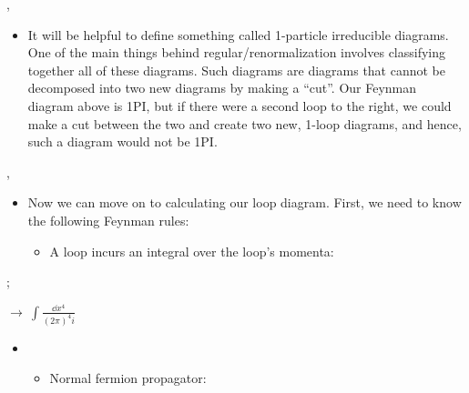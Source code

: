\sep

\begin{itemize}
    \item It will be helpful to define something called 1-particle irreducible diagrams. One of the main things behind regular/renormalization involves classifying together all of these diagrams. Such diagrams are diagrams that cannot be decomposed into two new diagrams by making a ``cut''. Our Feynman diagram above is 1PI, but if there were a second loop to the right, we could make a cut between the two and create two new, 1-loop diagrams, and hence, such a diagram would not be 1PI.
\end{itemize}


\sep


\begin{itemize}
    \item Now we can move on to calculating our loop diagram. First, we need to know the following Feynman rules:
    \begin{itemize}
        \item A loop incurs an integral over the loop's momenta:
    \end{itemize}
\end{itemize}

\begin{center}
\begin{minipage}{0.4\textwidth}
    \begin{flushright}
        ;
    \end{flushright}
\end{minipage}\hspace*{1em}
\begin{minipage}{0.4\textwidth}
    \begin{flushleft}
        $\displaystyle\rightarrow\ \int \frac{\dd x^4}{(2\pi)^4i}$
    \end{flushleft}
\end{minipage}
\end{center}




\begin{itemize}
    \item[]
    \begin{itemize}
        \item Normal fermion propagator:
    \end{itemize}
\end{itemize}

